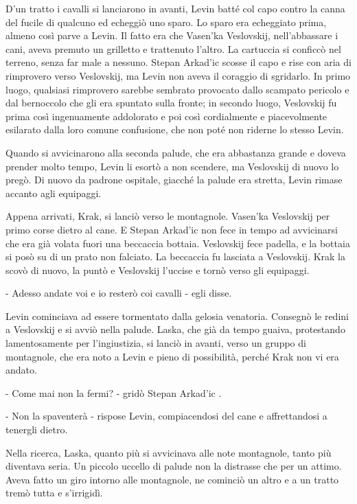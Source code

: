 D'un tratto i cavalli si lanciarono in avanti, Levin batté col capo contro la canna del fucile di qualcuno ed echeggiò uno sparo. Lo sparo era echeggiato prima, almeno così parve a Levin. Il fatto era che Vasen'ka Veslovskij, nell'abbassare i cani, aveva premuto un grilletto e trattenuto l'altro. La cartuccia si conficcò nel terreno, senza far male a nessuno. Stepan Arkad'ic scosse il capo e rise con aria di rimprovero verso Veslovskij, ma Levin non aveva il coraggio di sgridarlo. In primo luogo, qualsiasi rimprovero sarebbe sembrato provocato dallo scampato pericolo e dal bernoccolo che gli era spuntato sulla fronte; in secondo luogo, Veslovskij fu prima così ingenuamente addolorato e poi così cordialmente e piacevolmente esilarato dalla loro comune confusione, che non poté non riderne lo stesso Levin. 

Quando si avvicinarono alla seconda palude, che era abbastanza grande e doveva prender molto tempo, Levin li esortò a non scendere, ma Veslovskij di nuovo lo pregò. Di nuovo da padrone ospitale, giacché la palude era stretta, Levin rimase accanto agli equipaggi. 

Appena arrivati, Krak, si lanciò verso le montagnole. Vasen'ka Veslovskij per primo corse dietro al cane. E Stepan Arkad'ic non fece in tempo ad avvicinarsi che era già volata fuori una beccaccia bottaia. Veslovskij fece padella, e la bottaia si posò su di un prato non falciato. La beccaccia fu lasciata a Veslovskij. Krak la scovò di nuovo, la puntò e Veslovskij l'uccise e tornò verso gli equipaggi. 

- Adesso andate voi e io resterò coi cavalli - egli disse. 

Levin cominciava ad essere tormentato dalla gelosia venatoria. Consegnò le redini a Veslovskij e si avviò nella palude. Laska, che già da tempo guaiva, protestando lamentosamente per l'ingiustizia, si lanciò in avanti, verso un gruppo di montagnole, che era noto a Levin e pieno di possibilità, perché Krak non vi era andato. 

- Come mai non la fermi? - gridò Stepan Arkad'ic . 

- Non la spaventerà - rispose Levin, compiacendosi del cane e affrettandosi a tenergli dietro. 

Nella ricerca, Laska, quanto più si avvicinava alle note montagnole, tanto più diventava seria. Un piccolo uccello di palude non la distrasse che per un attimo. Aveva fatto un giro intorno alle montagnole, ne cominciò un altro e a un tratto tremò tutta e s'irrigidì. 


